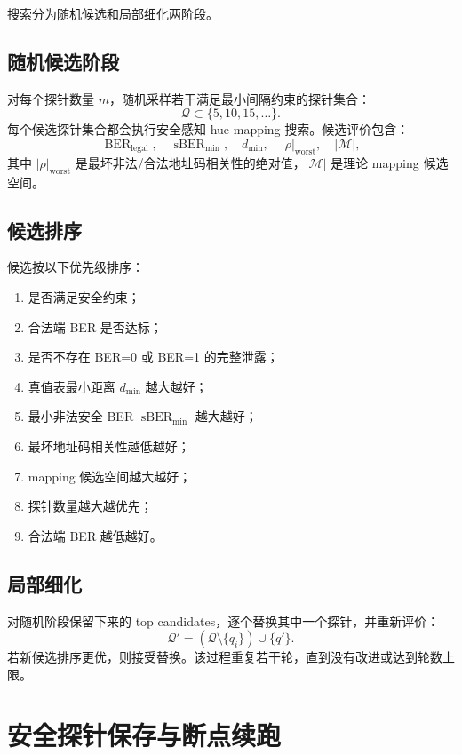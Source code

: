 \documentclass[UTF8,a4paper,11pt]{ctexart}
\newcommand{\BER}{\operatorname{BER}}
\newcommand{\sBER}{\operatorname{sBER}}
\begin{document}
搜索分为随机候选和局部细化两阶段。

\subsection{随机候选阶段}

对每个探针数量 $m$，随机采样若干满足最小间隔约束的探针集合：
\[
\mathcal{Q}\subset\{5,10,15,\ldots\}.
\]
每个候选探针集合都会执行安全感知 hue mapping 搜索。候选评价包含：
\[
\BER_{\mathrm{legal}},\quad
\sBER_{\min},\quad
d_{\min},\quad
|\rho|_{\mathrm{worst}},\quad
|\mathcal{M}|,
\]
其中 $|\rho|_{\mathrm{worst}}$ 是最坏非法/合法地址码相关性的绝对值，$|\mathcal{M}|$ 是理论 mapping 候选空间。

\subsection{候选排序}

候选按以下优先级排序：
\begin{enumerate}[label=(\arabic*)]
  \item 是否满足安全约束；
  \item 合法端 BER 是否达标；
  \item 是否不存在 BER=0 或 BER=1 的完整泄露；
  \item 真值表最小距离 $d_{\min}$ 越大越好；
  \item 最小非法安全 BER $\sBER_{\min}$ 越大越好；
  \item 最坏地址码相关性越低越好；
  \item mapping 候选空间越大越好；
  \item 探针数量越大越优先；
  \item 合法端 BER 越低越好。
\end{enumerate}

\subsection{局部细化}

对随机阶段保留下来的 top candidates，逐个替换其中一个探针，并重新评价：
\[
\mathcal{Q}'=(\mathcal{Q}\setminus\{q_i\})\cup\{q'\}.
\]
若新候选排序更优，则接受替换。该过程重复若干轮，直到没有改进或达到轮数上限。

\section{安全探针保存与断点续跑}
\end{document}
